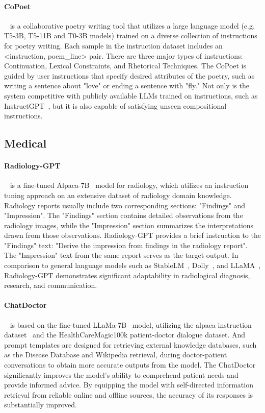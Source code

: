 \documentclass[11pt]{article}
\begin{document}
\paragraph{CoPoet}~\citep{Chakrabarty2022HelpMW} is a collaborative poetry writing tool that utilizes a large language model (e.g. T5-3B, T5-11B and T0-3B models) trained on a diverse collection of instructions for poetry writing. Each sample in the instruction dataset includes an <instruction, poem\_line> pair. There are three major types of instructions: Continuation, Lexical Constraints, and Rhetorical Techniques. The CoPoet is guided by user instructions that specify desired attributes of the poetry, such as writing a sentence about "love" or ending a sentence with "fly." Not only is the system competitive with publicly available LLMs trained on instructions, such as InstructGPT~\citep{ouyang2022training}, but it is also capable of satisfying unseen compositional instructions.

\subsection{Medical}
\paragraph{Radiology-GPT}~\citep{Liu2023RadiologyGPTAL} is a fine-tuned Alpaca-7B~\citep{taori2023alpaca} model for radiology, which utilizes an instruction tuning approach on an extensive dataset of radiology domain knowledge. Radiology reports usually include two corresponding sections: "Findings" and "Impression". The "Findings" section contains detailed observations from the radiology images, while the "Impression" section summarizes the interpretations drawn from those observations. Radiology-GPT provides a brief instruction to the "Findings" text: "Derive the impression from findings in the radiology report". The "Impression" text from the same report serves as the target output. In comparison to general language models such as StableLM~\citep{stabilityStabilityLaunches}, Dolly~\citep{conover2023free}, and LLaMA~\citep{Touvron2023LLaMAOA}, Radiology-GPT demonstrates significant adaptability in radiological diagnosis, research, and communication.

\paragraph{ChatDoctor}~\citep{Li2023ChatDoctorAM} is based on the fine-tuned LLaMa-7B~\citep{Touvron2023LLaMAOA} model, utilizing the alpaca instruction dataset~\citep{taori2023alpaca} and the HealthCareMagic100k patient-doctor dialogue dataset. And prompt templates are designed for retrieving external knowledge databases, such as the Disease Database and Wikipedia retrieval, during doctor-patient conversations to obtain more accurate outputs from the model. The ChatDoctor significantly improves the model's ability to comprehend patient needs and provide informed advice. By equipping the model with self-directed information retrieval from reliable online and offline sources, the accuracy of its responses is substantially improved.
\end{document}

